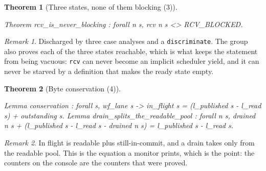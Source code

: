 \documentclass[10pt,journal,compsoc,twocolumn]{article}
\newtheorem{theorem}{Theorem}[section]
\theoremstyle{definition}
\theoremstyle{remark}
\newtheorem{remark}{Remark}[section]
\theoremstyle{plain}
\newcommand{\ctr}[1]{\texttt{#1}}
\begin{document}
\begin{theorem}[Three states, none of them blocking (3)]
\begin{coc}
Theorem rcv_is_never_blocking : forall n s, rcv n s <> RCV_BLOCKED.
\end{coc}\end{theorem}
\begin{remark}
Discharged by three case analyses and a \ctr{discriminate}. The group also
proves each of the three states reachable, which is what keeps the statement
from being vacuous: \ctr{rcv} can never become an implicit scheduler yield, and
it can never be starved by a definition that makes the ready state empty.
\end{remark}

\begin{theorem}[Byte conservation (4)]
\begin{coc}
Lemma conservation : forall s, wf_lane s ->
  in_flight s = (l_published s - l_read s) + outstanding s.
Lemma drain_splits_the_readable_pool : forall n s,
  drained n s + (l_published s - l_read s - drained n s) = l_published s - l_read s.
\end{coc}\end{theorem}
\begin{remark}
In flight is readable plus still-in-commit, and a drain takes only from the
readable pool. This is the equation a monitor prints, which is the point: the
counters on the console are the counters that were proved.
\end{remark}
\end{document}
